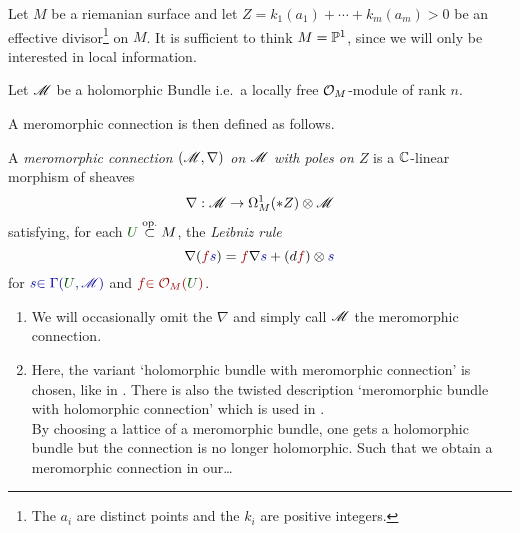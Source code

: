 Let $M$ be a riemanian surface and let $Z=k_1(a_1)+\cdots+k_m(a_m)>0$ be an
effective divisor\footnote{The $a_i$ are distinct points and the $k_i$ are
positive integers.} on $M$.
It is sufficient to think $M=\P^1$, since we will only be interested in local
information.

Let $\sM$ be a holomorphic Bundle i.e.\ a locally free $\cO_M$-module of rank
$n$.

A meromorphic connection is then defined as follows.
\begin{defn}
  \def\myU{\textcolor{green!30!black}{U}}
  \def\mys{\textcolor{blue!60!black}{s}}
  \def\myf{\textcolor{red!60!black}{f}}
  A \emph{meromorphic connection $(\sM,\nabla)$ on $\sM$ with poles on $Z$}
  is a $\C$-linear morphism of sheaves
  \[
    \nabla:\sM\to\Omega_M^1(*Z)\otimes\sM
  \]
  satisfying, for each $\myU\overset{\text{op.}}{\subset} M$, the
  \emph{Leibniz rule}
    \[
      \nabla(\myf\mys)=\myf\nabla\mys+(d\myf)\otimes\mys
    \]
  for $\mys\textcolor{blue!60!black}{\in\Gamma(\myU,\sM)}$ and
  $\myf\textcolor{red!60!black}{\in\cO_M(\myU)}$.
\end{defn}
\begin{rem}
  \begin{enumerate}
    \item We will occasionally omit the $\nabla$ and simply call $\sM$ the
      meromorphic connection.
    \item Here, the variant `holomorphic bundle with meromorphic connection' is
      chosen, like in \cite{boalch}.  There is also the twisted description
      `meromorphic bundle with holomorphic connection' which is used in
      \cite{sabbah2007isomonodromic}.
      \\ By choosing a lattice of a meromorphic bundle, one gets a holomorphic
      bundle but the connection is no longer holomorphic. Such that we obtain a
      meromorphic connection in our\dots\TODO
  \end{enumerate}
\end{rem}

